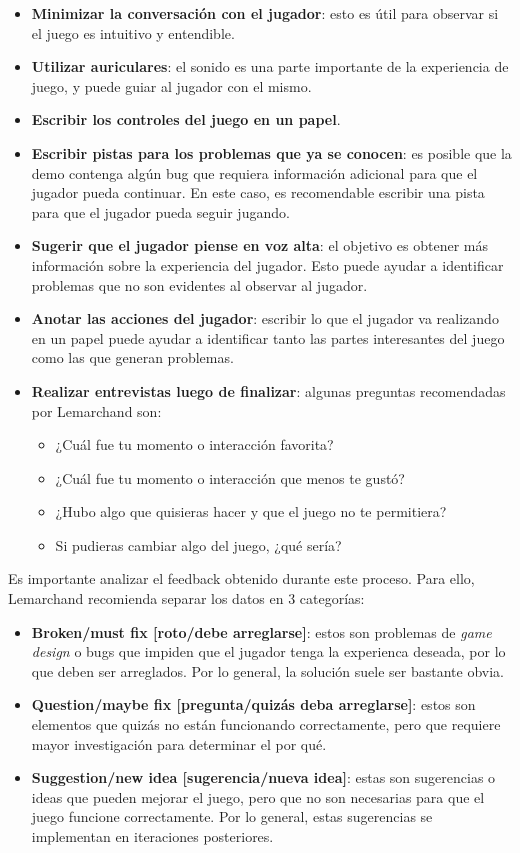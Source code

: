 \begin{itemize}
    \item \textbf{Minimizar la conversación con el jugador}: esto es útil para observar si el juego es intuitivo y entendible. 
    \item \textbf{Utilizar auriculares}: el sonido es una parte importante de la experiencia de juego, y puede guiar al jugador con el mismo.
    \item \textbf{Escribir los controles del juego en un papel}.
    \item \textbf{Escribir pistas para los problemas que ya se conocen}: es posible que la demo contenga algún bug  que requiera información adicional para que el jugador pueda continuar. En este caso, es recomendable escribir una pista para que el jugador pueda seguir jugando.
    \item \textbf{Sugerir que el jugador piense en voz alta}: el objetivo es obtener más información sobre la experiencia del jugador. Esto puede ayudar a identificar problemas que no son evidentes al observar al jugador.
    \item \textbf{Anotar las acciones del jugador}: escribir lo que el jugador va realizando en un papel puede ayudar a identificar tanto las partes interesantes del juego como las que generan problemas.
    \item \textbf{Realizar entrevistas luego de finalizar}: algunas preguntas recomendadas por Lemarchand son:
    \begin{itemize}
        \item ¿Cuál fue tu momento o interacción favorita?
        \item ¿Cuál fue tu momento o interacción que menos te gustó?
        \item ¿Hubo algo que quisieras hacer y que el juego no te permitiera? 
        \item Si pudieras cambiar algo del juego, ¿qué sería?
    \end{itemize}
\end{itemize}

\par Es importante analizar el feedback obtenido durante este proceso. Para ello, Lemarchand recomienda separar los datos en 3 categorías:
\begin{itemize}
    \item \textbf{Broken/must fix [roto/debe arreglarse]}: estos son problemas de \textit{game design} o bugs que impiden que el jugador tenga la experienca deseada, por lo que deben ser arreglados. Por lo general, la solución suele ser bastante obvia.
    \item \textbf{Question/maybe fix [pregunta/quizás deba arreglarse]}: estos son elementos que quizás no están funcionando correctamente, pero que requiere mayor investigación para determinar el por qué.
    \item \textbf{Suggestion/new idea [sugerencia/nueva idea]}: estas son sugerencias o ideas que pueden mejorar el juego, pero que no son necesarias para que el juego funcione correctamente. Por lo general, estas sugerencias se implementan en iteraciones posteriores.
\end{itemize}
%
%
